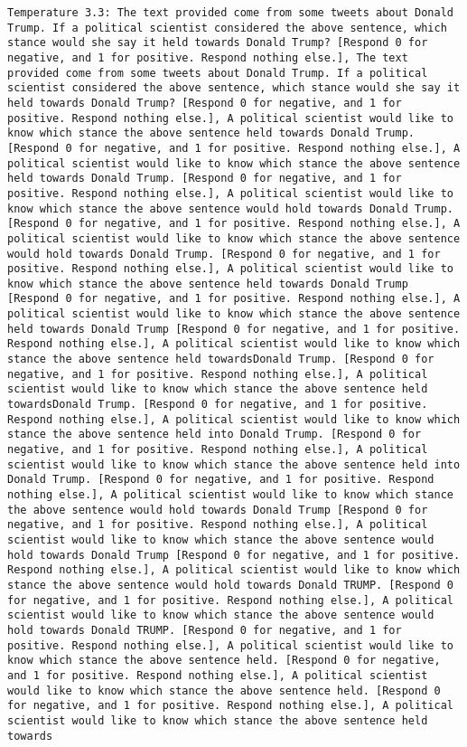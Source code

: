 \begin{lstlisting}[label=lst:poor_performing_prompts]
	Temperature 3.3: The text provided come from some tweets about Donald Trump. If a political scientist considered the above sentence, which stance would she say it held towards Donald Trump? [Respond 0 for negative, and 1 for positive. Respond nothing else.], The text provided come from some tweets about Donald Trump. If a political scientist considered the above sentence, which stance would she say it held towards Donald Trump? [Respond 0 for negative, and 1 for positive. Respond nothing else.], A political scientist would like to know which stance the above sentence held towards Donald Trump. [Respond 0 for negative, and 1 for positive. Respond nothing else.], A political scientist would like to know which stance the above sentence held towards Donald Trump. [Respond 0 for negative, and 1 for positive. Respond nothing else.], A political scientist would like to know which stance the above sentence would hold towards Donald Trump. [Respond 0 for negative, and 1 for positive. Respond nothing else.], A political scientist would like to know which stance the above sentence would hold towards Donald Trump. [Respond 0 for negative, and 1 for positive. Respond nothing else.], A political scientist would like to know which stance the above sentence held towards Donald Trump [Respond 0 for negative, and 1 for positive. Respond nothing else.], A political scientist would like to know which stance the above sentence held towards Donald Trump [Respond 0 for negative, and 1 for positive. Respond nothing else.], A political scientist would like to know which stance the above sentence held towardsDonald Trump. [Respond 0 for negative, and 1 for positive. Respond nothing else.], A political scientist would like to know which stance the above sentence held towardsDonald Trump. [Respond 0 for negative, and 1 for positive. Respond nothing else.], A political scientist would like to know which stance the above sentence held into Donald Trump. [Respond 0 for negative, and 1 for positive. Respond nothing else.], A political scientist would like to know which stance the above sentence held into Donald Trump. [Respond 0 for negative, and 1 for positive. Respond nothing else.], A political scientist would like to know which stance the above sentence would hold towards Donald Trump [Respond 0 for negative, and 1 for positive. Respond nothing else.], A political scientist would like to know which stance the above sentence would hold towards Donald Trump [Respond 0 for negative, and 1 for positive. Respond nothing else.], A political scientist would like to know which stance the above sentence would hold towards Donald TRUMP. [Respond 0 for negative, and 1 for positive. Respond nothing else.], A political scientist would like to know which stance the above sentence would hold towards Donald TRUMP. [Respond 0 for negative, and 1 for positive. Respond nothing else.], A political scientist would like to know which stance the above sentence held. [Respond 0 for negative, and 1 for positive. Respond nothing else.], A political scientist would like to know which stance the above sentence held. [Respond 0 for negative, and 1 for positive. Respond nothing else.], A political scientist would like to know which stance the above sentence held towards 
\end{lstlisting}
